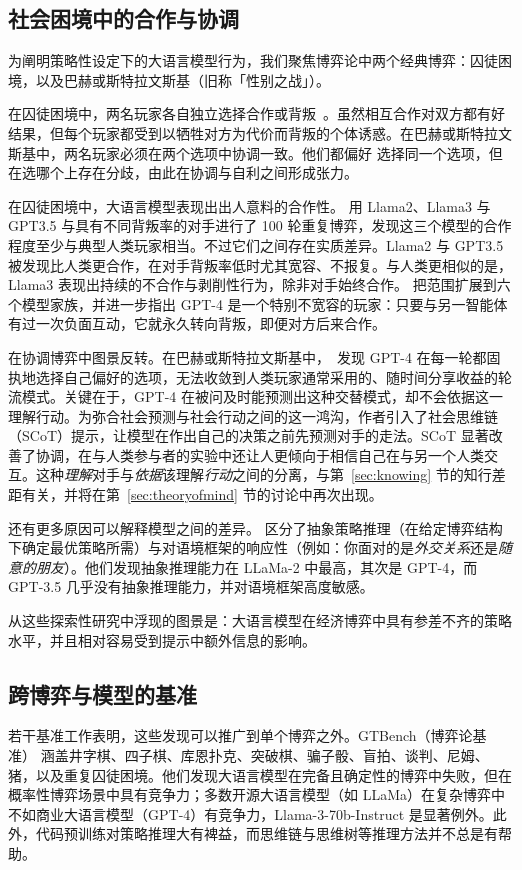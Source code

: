 \subsection{社会困境中的合作与协调}
为阐明策略性设定下的大语言模型行为，我们聚焦博弈论中两个经典博弈：囚徒困境，以及巴赫或斯特拉文斯基（旧称「性别之战」）。

在囚徒困境中，两名玩家各自独立选择合作或背叛~\citep{axelrod1987evolution}。虽然相互合作对双方都有好结果，但每个玩家都受到以牺牲对方为代价而背叛的个体诱惑。在巴赫或斯特拉文斯基中，两名玩家必须在两个选项中协调一致。他们都偏好
选择同一个选项，但在选哪个上存在分歧，由此在协调与自利之间形成张力。

在囚徒困境中，大语言模型表现出出人意料的合作性。\citet{fontana2025nicer} 用 Llama2、Llama3 与 GPT3.5 与具有不同背叛率的对手进行了 100 轮重复博弈，发现这三个模型的合作程度至少与典型人类玩家相当。不过它们之间存在实质差异。Llama2 与 GPT3.5 被发现比人类更合作，在对手背叛率低时尤其宽容、不报复。与人类更相似的是，Llama3 表现出持续的不合作与剥削性行为，除非对手始终合作。\citet{akata2025playing} 把范围扩展到六个模型家族，并进一步指出 GPT-4 是一个特别不宽容的玩家：只要与另一智能体有过一次负面互动，它就永久转向背叛，即便对方后来合作。

在协调博弈中图景反转。在巴赫或斯特拉文斯基中，\citet{akata2025playing}\ 发现 GPT-4 在每一轮都固执地选择自己偏好的选项，无法收敛到人类玩家通常采用的、随时间分享收益的轮流模式。关键在于，GPT-4 在被问及时能预测出这种交替模式，却不会依据这一理解行动。为弥合社会预测与社会行动之间的这一鸿沟，作者引入了社会思维链（SCoT）提示，让模型在作出自己的决策之前先预测对手的走法。SCoT 显著改善了协调，在与人类参与者的实验中还让人更倾向于相信自己在与另一个人类交互。这种{\em 理解}对手与{\em 依据}该理解{\em 行动}之间的分离，与第~\ref{sec:knowing} 节的知行差距有关，并将在第~\ref{sec:theoryofmind} 节的讨论中再次出现。

还有更多原因可以解释模型之间的差异。\citet{lore2023strategic} 区分了抽象策略推理（在给定博弈结构下确定最优策略所需）与对语境框架的响应性（例如：你面对的是{\em 外交关系}还是{\em 随意的朋友}）。他们发现抽象推理能力在 LLaMa-2 中最高，其次是 GPT-4，而 GPT-3.5 几乎没有抽象推理能力，并对语境框架高度敏感。

从这些探索性研究中浮现的图景是：大语言模型在经济博弈中具有参差不齐的策略水平，并且相对容易受到提示中额外信息的影响。

\subsection{跨博弈与模型的基准} 若干基准工作表明，这些发现可以推广到单个博弈之外。GTBench（博弈论基准）\citep{duan2024gtbench} 涵盖井字棋、四子棋、库恩扑克、突破棋、骗子骰、盲拍、谈判、尼姆、猪，以及重复囚徒困境。他们发现大语言模型在完备且确定性的博弈中失败，但在概率性博弈场景中具有竞争力；多数开源大语言模型（如 LLaMa）在复杂博弈中不如商业大语言模型（GPT-4）有竞争力，Llama-3-70b-Instruct 是显著例外。此外，代码预训练对策略推理大有裨益，而思维链与思维树等推理方法并不总是有帮助。

